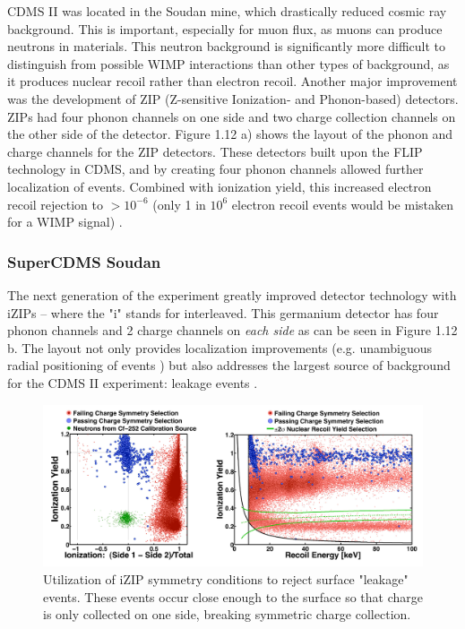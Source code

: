 \documentclass{report}
\begin{document}
CDMS II was located in the Soudan mine, which drastically reduced cosmic ray background. This is important, especially for muon flux, as muons can produce neutrons in materials. This neutron background is significantly more difficult to distinguish from possible WIMP interactions than other types of background, as it produces nuclear recoil rather than electron recoil. Another major improvement was the development of ZIP (Z-sensitive Ionization- and Phonon-based) detectors. ZIPs had four phonon channels on one side and two charge collection channels on the other side of the detector. Figure 1.12 a) shows the layout of the phonon and charge channels for the ZIP detectors. These detectors built upon the FLIP technology in CDMS, and by creating four phonon channels allowed further localization of events. Combined with ionization yield, this increased electron recoil rejection to $> 10^{-6}$ (only 1 in $10^6$ electron recoil events would be mistaken for a WIMP signal) \cite{Saab2012}.

\subsubsection{SuperCDMS Soudan}

The next generation of the experiment greatly improved detector technology with iZIPs -- where the "i" stands for interleaved. This germanium detector has four phonon channels and 2 charge channels on \emph{each side} as can be seen in Figure 1.12 b. The layout not only provides localization improvements (e.g. unambiguous radial positioning of events \cite{DOE}) but also addresses the largest source of background for the CDMS II experiment: leakage events \cite{Akerib2005}.

\begin{figure}[h]
\centering
\includegraphics[width = .8\textwidth]{iZIP_ionization.png}
\caption{Utilization of iZIP symmetry conditions to reject surface "leakage" events. These events occur close enough to the surface so that charge is only collected on one side, breaking symmetric charge collection.}
\end{figure}
\end{document}
